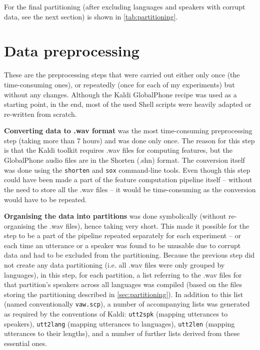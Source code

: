 \documentclass[bsc,frontabs,twoside,singlespacing,parskip,deptreport]{infthesis}
\begin{document}
{{    For the final partitioning (after excluding languages and speakers with corrupt data, see the next section) is shown in \autoref{tab:partitioning}.  
  }

  \section{Data preprocessing}{
    \label{sec:preprocessing}
    These are the preprocessing steps that were carried out either only once (the time-consuming ones), or repeatedly (once for each of my experiments) but without any changes. Although the Kaldi GlobalPhone recipe was used as a starting point, in the end, most of the used Shell scripts were heavily adapted or re-written from scratch.

    \textbf{Converting data to .wav format} was the most time-consuming preprocessing step (taking more than 7 hours) and was done only once. The reason for this step is that the Kaldi toolkit requires .wav files for computing features, but the GlobalPhone audio files are in the Shorten (.shn) format. The conversion itself was done using the \texttt{shorten} and \texttt{sox} command-line tools. Even though this step could have been made a part of the feature computation pipeline itself -- without the need to store all the .wav files -- it would be time-consuming as the conversion would have to be repeated.

    \textbf{Organising the data into partitions} was done symbolically (without re-organising the .wav files), hence taking very short. This made it possible for the step to be a part of the pipeline repeated separately for each experiment -- or each time an utterance or a speaker was found to be unusable due to corrupt data and had to be excluded from the partitioning. Because the previous step did not create any data partitioning (i.e. all .wav files were only grouped by languages), in this step, for each partition, a list referring to the .wav files for that partition's speakers across all languages was compiled (based on the files storing the partitioning described in \autoref{sec:partitioning}). In addition to this list (named conventionally \texttt{vaw.scp}), a number of accompanying lists was generated as required by the conventions of Kaldi: \texttt{utt2spk} (mapping utterances to speakers), \texttt{utt2lang} (mapping utterances to languages), \texttt{utt2len} (mapping utterances to their lengths), and a number of further lists derived from these essential ones.

}}
\end{document}
